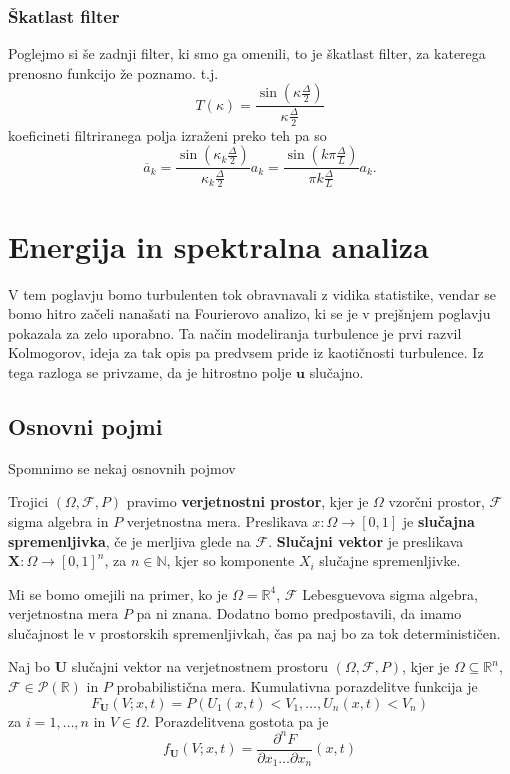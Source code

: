 \documentclass[mat2, tisk]{fmfdelo}
\newcommand{\R}{\mathbb R}
\newcommand{\N}{\mathbb N}
\newcommand{\bd}{\textbf}
\begin{document}
\subsubsection{Škatlast filter}
Poglejmo si še zadnji filter, ki smo ga omenili, to je 
škatlast filter, za katerega prenosno funkcijo že poznamo. t.j.
$$
T(\kappa) = \frac{\sin(\kappa \frac{\Delta}{2})}{\kappa \frac{\Delta}{2}}
$$
koeficineti filtriranega polja izraženi preko teh pa so 
$$
\overline{a}_k = \frac{\sin(\kappa_k \frac{\Delta}{2})}{\kappa_k \frac{\Delta}{2}} a_k = \frac{\sin(k\pi\frac{\Delta}{L})}{\pi k\frac{\Delta}{L}} a_k .
$$


\section{Energija in spektralna analiza}

V tem poglavju bomo turbulenten tok obravnavali z vidika statistike, 
vendar se bomo hitro začeli nanašati na Fourierovo analizo, ki 
se je v prejšnjem poglavju pokazala za zelo uporabno. Ta način 
modeliranja turbulence je prvi razvil Kolmogorov, ideja za tak 
opis pa predvsem pride iz kaotičnosti turbulence. Iz tega razloga se 
privzame, da je hitrostno polje $\bd{u}$ slučajno. 

\subsection{Osnovni pojmi}

Spomnimo se nekaj osnovnih pojmov

\begin{definicija}
Trojici $(\Omega, \mathcal{F}, P)$ pravimo \textbf{verjetnostni prostor}, 
kjer je $\Omega$ vzorčni prostor, $\mathcal{F}$ sigma algebra in 
$P$ verjetnostna mera. Preslikava $x: \Omega \rightarrow [0, 1]$ 
je \textbf{slučajna spremenljivka}, če je merljiva glede na $\mathcal{F}$. 
\textbf{Slučajni vektor} je preslikava $\bd{X}: \Omega \rightarrow [0, 1]^n$, 
za $n\in \N$, kjer so komponente $X_i$ slučajne spremenljivke.
\end{definicija}

Mi se bomo omejili na primer, ko je $\Omega = \R^4$, $\mathcal{F}$ 
Lebesguevova sigma algebra, verjetnostna mera $P$ pa ni znana. 
Dodatno bomo predpostavili, da imamo slučajnost le v prostorskih 
spremenljivkah, čas pa naj bo za tok determinističen. 

\begin{definicija}
Naj bo $\bd{U}$ slučajni vektor na verjetnostnem prostoru $(\Omega, \mathcal{F}, P)$,
kjer je $\Omega \subseteq \R^n$, $\mathcal{F} \in \mathcal{P}(\R)$ in $P$ probabilistična mera.
Kumulativna porazdelitve funkcija je
\begin{equation}
F_\bd{U}(V; x, t) = P(U_1(x, t) < V_1, \dots, U_n(x, t) < V_n)
\end{equation}
za $i = 1, \dots, n$ in $V \in \Omega$. Porazdelitvena 
gostota pa je 
\begin{equation}
f_\bd{U}(V; x, t) = \frac{\partial^n F}{\partial x_1 \dots \partial x_n}(x, t)
\end{equation}
\end{definicija}
\end{document}
